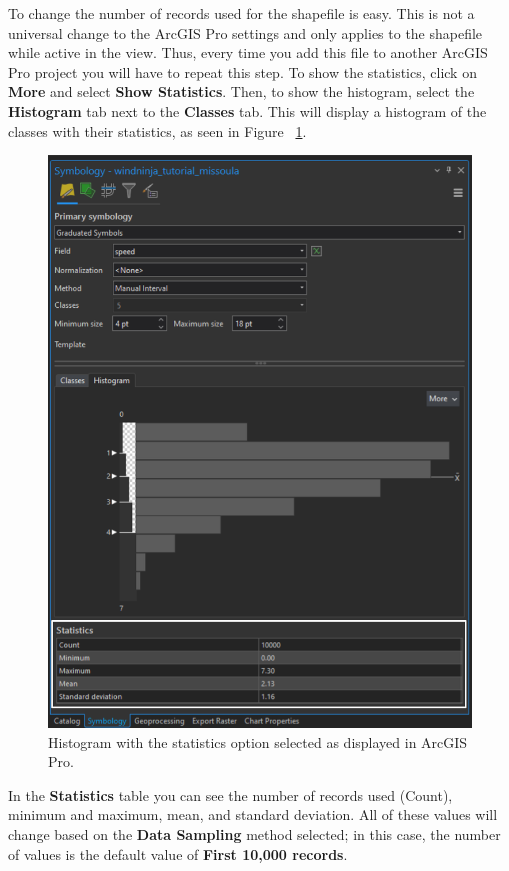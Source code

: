 \documentclass[12pt]{article}
\begin{document}
\pagebreak

To change the number of records used for the shapefile is easy. This is not a universal change to the ArcGIS Pro settings and only applies to the shapefile while active in the view. Thus, every time you add this file to another ArcGIS Pro project you will have to repeat this step. To show the statistics, click on \textbf{More} and select \textbf{Show Statistics}. Then, to show the histogram, select the \textbf{Histogram} tab next to the \textbf{Classes} tab. This will display a histogram of the classes with their statistics, as seen in Figure ~\ref{fig:Figure18}.

\begin{figure}[H]
	\centering
	\includegraphics[scale=0.42]{arc_18.png}
	\caption{Histogram with the statistics option selected as displayed in ArcGIS Pro.}
\label{fig:Figure18}
\end{figure}

In the \textbf{Statistics} table you can see the number of records used (Count), minimum and maximum, mean, and standard deviation. All of these values will change based on the \textbf{Data Sampling} method selected; in this case, the number of values is the default value of \textbf{First 10,000 records}.  
\end{document}
